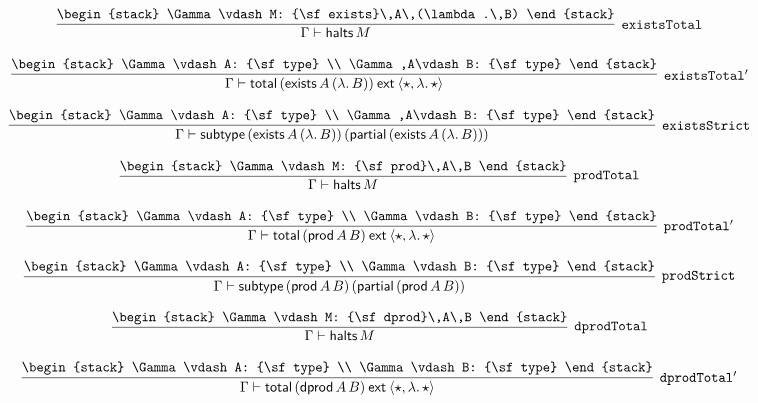 \[
\infer[{\tt existsTotal}]{\Gamma \vdash {\sf halts}\,M}{
\begin{stack}
\Gamma \vdash M: {\sf exists}\,A\,(\lambda .\,B)
\end{stack}}
\]

\[
\infer[{\tt existsTotal'}]{\Gamma \vdash {\sf total}\,({\sf exists}\,A\,(\lambda .\,B))\:{\sf ext}\:\langle \star ,\lambda .\,\star \rangle }{
\begin{stack}
\Gamma \vdash A: {\sf type}
\\
\Gamma ,A\vdash B: {\sf type}
\end{stack}}
\]

\[
\infer[{\tt existsStrict}]{\Gamma \vdash {\sf subtype}\,({\sf exists}\,A\,(\lambda .\,B))\,({\sf partial}\,({\sf exists}\,A\,(\lambda .\,B)))}{
\begin{stack}
\Gamma \vdash A: {\sf type}
\\
\Gamma ,A\vdash B: {\sf type}
\end{stack}}
\]

\[
\infer[{\tt prodTotal}]{\Gamma \vdash {\sf halts}\,M}{
\begin{stack}
\Gamma \vdash M: {\sf prod}\,A\,B
\end{stack}}
\]

\[
\infer[{\tt prodTotal'}]{\Gamma \vdash {\sf total}\,({\sf prod}\,A\,B)\:{\sf ext}\:\langle \star ,\lambda .\,\star \rangle }{
\begin{stack}
\Gamma \vdash A: {\sf type}
\\
\Gamma \vdash B: {\sf type}
\end{stack}}
\]

\[
\infer[{\tt prodStrict}]{\Gamma \vdash {\sf subtype}\,({\sf prod}\,A\,B)\,({\sf partial}\,({\sf prod}\,A\,B))}{
\begin{stack}
\Gamma \vdash A: {\sf type}
\\
\Gamma \vdash B: {\sf type}
\end{stack}}
\]

\[
\infer[{\tt dprodTotal}]{\Gamma \vdash {\sf halts}\,M}{
\begin{stack}
\Gamma \vdash M: {\sf dprod}\,A\,B
\end{stack}}
\]

\[
\infer[{\tt dprodTotal'}]{\Gamma \vdash {\sf total}\,({\sf dprod}\,A\,B)\:{\sf ext}\:\langle \star ,\lambda .\,\star \rangle }{
\begin{stack}
\Gamma \vdash A: {\sf type}
\\
\Gamma \vdash B: {\sf type}
\end{stack}}
\]

